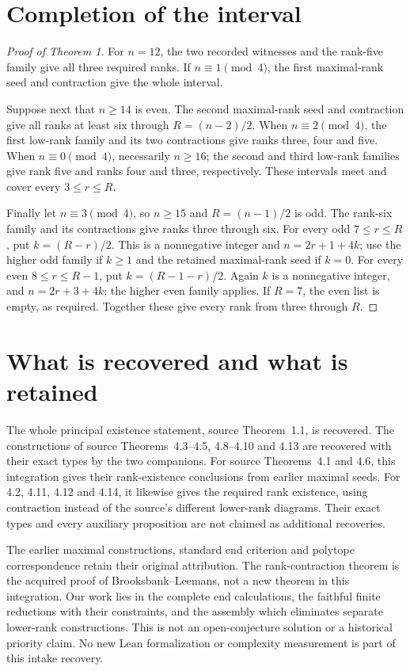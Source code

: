 \documentclass[11pt]{article}
\begin{document}
\section{Completion of the interval}
\begin{proof}[Proof of Theorem 1]
For $n=12$, the two recorded witnesses and the rank-five family
give all three required ranks. If $n\equiv1\pmod4$, the first
maximal-rank seed and contraction give the whole interval.

Suppose next that $n\ge14$ is even. The second maximal-rank
seed and contraction give all ranks at least six through
$R=(n-2)/2$. When $n\equiv2\pmod4$, the first low-rank
family and its two contractions give ranks three, four and five.
When $n\equiv0\pmod4$, necessarily $n\ge16$; the second
and third low-rank families give rank five and ranks four and
three, respectively. These intervals meet and cover every
$3\le r\le R$.

Finally let $n\equiv3\pmod4$, so $n\ge15$ and
$R=(n-1)/2$ is odd. The rank-six family and its contractions
give ranks three through six. For every odd $7\le r\le R$,
put $k=(R-r)/2$. This is a nonnegative integer and
$n=2r+1+4k$; use the higher odd family if $k\ge1$ and the
retained maximal-rank seed if $k=0$. For every even
$8\le r\le R-1$, put $k=(R-1-r)/2$. Again $k$ is a
nonnegative integer, and $n=2r+3+4k$; the higher even family
applies. If $R=7$, the even list is empty, as required.
Together these give every rank from three through $R$.
\end{proof}

\section{What is recovered and what is retained}
The whole principal existence statement, source Theorem~1.1,
is recovered. The constructions of source Theorems~4.3--4.5,
4.8--4.10 and 4.13 are recovered with their exact types by the
two companions. For source Theorems~4.1 and 4.6, this integration
gives their rank-existence conclusions from earlier maximal seeds.
For 4.2, 4.11, 4.12 and 4.14, it likewise gives the required
rank existence, using contraction instead of the source's
different lower-rank diagrams. Their exact types and every
auxiliary proposition are not claimed as additional recoveries.

The earlier maximal constructions, standard end criterion and
polytope correspondence retain their original attribution.
The rank-contraction theorem is the acquired proof of
Brooksbank--Leemans, not a new theorem in this integration.
Our work lies in the complete end calculations, the faithful
finite reductions with their constraints, and the assembly
which eliminates separate lower-rank constructions. This is
not an open-conjecture solution or a historical priority claim.
No new Lean formalization or complexity measurement is part
of this intake recovery.
\end{document}
